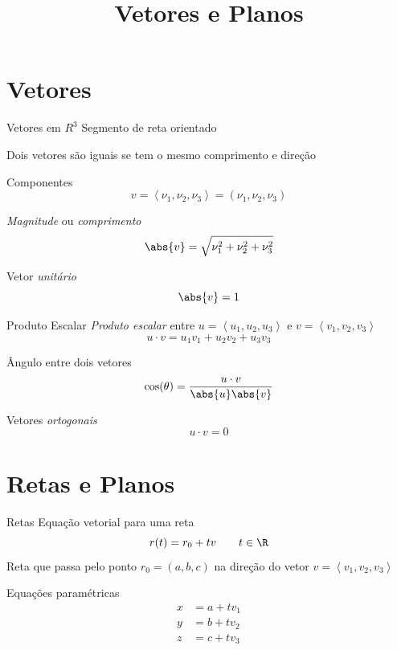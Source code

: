 \documentclass[fleqn,utf8,aspectratio=169,12pt]{beamer}
\title{Vetores e Planos}
\begin{document}
\addtitle

\section{Vetores}

\begin{frame}{Vetores em $R^3$}
  Segmento de reta orientado

  \pause
  Dois vetores são iguais se tem o mesmo comprimento e direção

  \pause
  Componentes
  \[
    v
    = \left< \nu_1, \nu_2, \nu_3 \right>
    = \left( \nu_1, \nu_2, \nu_3 \right)
  \]

  \pause
  \emph{Magnitude} ou \emph{comprimento}
  \[
    \abs{v} = \sqrt{\nu_1^2 + \nu_2^2 + \nu_3^2}
  \]

  \pause
  Vetor \emph{unitário}
  \[
    \abs{v} = 1
  \]
\end{frame}

\begin{frame}{Produto Escalar}
  \emph{Produto escalar} entre
  \(u=\left<u_1, u_2, u_3\right>\) e
  \(v=\left<v_1, v_2, v_3\right>\)
  \[
    u\cdot v = u_1v_1 + u_2v_2 + u_3v_3
  \]

  \pause
  Ângulo entre dois vetores
  \[
    \cos(\theta) = \frac{u\cdot v}{\abs{u}\abs{v}}
  \]

  \pause
  Vetores \emph{ortogonais}
  \[
    u\cdot v = 0
  \]
  \end{frame}

\section{Retas e Planos}

\begin{frame}{Retas}
  Equação vetorial para uma reta
  \[
    r(t) = r_0 + tv
    \qquad
    t\in\R
  \]
  Reta que passa pelo ponto \(r_0=\left(a, b, c\right)\)
  na direção do vetor \(v=\left<v_1, v_2, v_3\right>\)

  \pause
  \vspace{\baselineskip}
  Equações paramétricas
  \begin{align*}
    x & = a + tv_1 \\
    y & = b + tv_2 \\
    z & = c + tv_3 \\
  \end{align*}
\end{frame}
\end{document}

